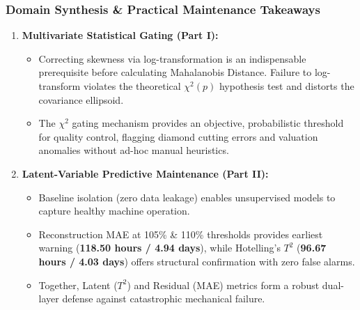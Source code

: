 \vspace{0.4em}
\begin{tcolorbox}[colback=blue!5!white,colframe=blue!75!black,boxrule=0.8pt,arc=3pt,left=6pt,right=6pt,top=4pt,bottom=4pt,breakable,before upper={\sloppy\raggedright},title=\textbf{\small Domain Synthesis \& Practical Maintenance Takeaways}]
\subsubsection{Domain Synthesis \& Practical Maintenance Takeaways}

\begin{enumerate}
\def\labelenumi{\arabic{enumi}.}
\tightlist
\item
  \textbf{Multivariate Statistical Gating (Part I):}

  \begin{itemize}
  \tightlist
  \item
    Correcting skewness via log-transformation is an indispensable prerequisite before calculating Mahalanobis Distance. Failure to log-transform violates the theoretical \(\chi^2(p)\) hypothesis test and distorts the covariance ellipsoid.
  \item
    The \(\chi^2\) gating mechanism provides an objective, probabilistic threshold for quality control, flagging diamond cutting errors and valuation anomalies without ad-hoc manual heuristics.
  \end{itemize}
\item
  \textbf{Latent-Variable Predictive Maintenance (Part II):}

  \begin{itemize}
  \tightlist
  \item
    Baseline isolation (zero data leakage) enables unsupervised models to capture healthy machine operation.
  \item
    Reconstruction MAE at 105\% \& 110\% thresholds provides earliest warning (\textbf{118.50 hours / 4.94 days}), while Hotelling's \(T^2\) (\textbf{96.67 hours / 4.03 days}) offers structural confirmation with zero false alarms.
  \item
    Together, Latent (\(T^2\)) and Residual (MAE) metrics form a robust dual-layer defense against catastrophic mechanical failure.
  \end{itemize}
\end{enumerate}
\end{tcolorbox}
\vspace{0.3em}
